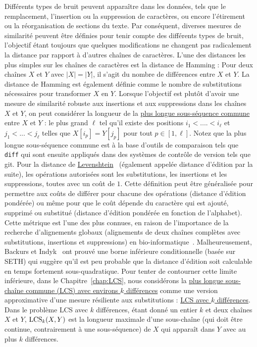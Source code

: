 Différents types de bruit peuvent apparaître dans les données, tels que le remplacement, l'insertion ou la suppression de caractères, ou encore l'étirement ou la réorganisation de sections du texte. Par conséquent, diverses mesures de similarité peuvent être définies pour tenir compte des différents types de bruit, l'objectif étant toujours que quelques modifications ne changent pas radicalement la distance par rapport à d'autres chaînes de caractères.
L'une des distances les plus simples sur les chaînes de caractères est la distance de Hamming : Pour deux chaînes $X$ et $Y$ avec $|X|=|Y|$, il s'agit du nombre de différences entre $X$ et $Y$. La distance de Hamming est également définie comme le nombre de substitutions nécessaires pour transformer $X$ en $Y$.
Lorsque l'objectif est plutôt d'avoir une mesure de similarité robuste aux insertions et aux suppressions dans les chaînes $X$ et $Y$, on peut considérer la longueur de la \underline{plus longue sous-séquence commune} entre $X$ et $Y$ : le plus grand $\ell$ tel qu'il existe des positions $i_1<.... < i_\ell$ et $j_1< ... < j_\ell$ telles que $X[i_p] = Y[j_p]$ pour tout $p \in [1,\ell]$. Notez que la plus longue sous-séquence commune est à la base d'outils de comparaison tels que \texttt{diff} qui sont ensuite appliqués dans des systèmes de contrôle de version tels que git.
Pour la distance de \underline{Levenshtein}~\cite{levenshtein1966binary} (également appelée distance d'édition par la suite), les opérations autorisées sont les substitutions, les insertions et les suppressions, toutes avec un coût de $1$. Cette définition peut être généralisée pour permettre aux coûts de différer pour chacune des opérations (distance d'édition pondérée) ou même pour que le coût dépende du caractère qui est ajouté, supprimé ou substitué (distance d'édition pondérée en fonction de l'alphabet). Cette métrique est l'une des plus connues, en raison de l'importance de la recherche d'alignements globaux (alignements de deux chaînes complètes avec substitutions, insertions et suppressions) en bio-informatique~\cite{Gusfield1997}.
Malheureusement, Backurs et Indyk~\cite{DBLP:conf/stoc/BackursI15} ont prouvé une borne inférieure conditionnelle (basée sur SETH) qui suggère qu'il est peu probable que la distance d'édition soit calculable en temps fortement sous-quadratique.
Pour tenter de contourner cette limite inférieure, dans le Chapitre~\ref{chap:LCS}, nous considérons la \underline{plus longue sous-chaîne  commune (LCS) avec environs $k$ différences} comme une version approximative d'une mesure résiliente aux substitutions : \underline{LCS avec $k$ différences}. Dans le problème LCS avec $k$ différences, étant donné un entier $k$ et deux chaînes $X$ et $Y$, $\mathrm{LCS}_{k}(X,Y)$ est la longueur maximale d'une sous-chaîne (qui doit être continue, contrairement à une sous-séquence) de $X$ qui apparaît dans $Y$ avec au plus $k$ différences. 
